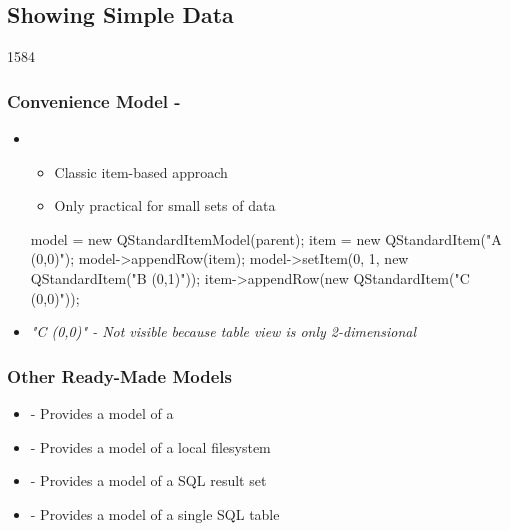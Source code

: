 %
%
%
%

\subsection{Showing Simple Data}


\begin{slide}[fragile]{1584}
\frametitle{Convenience Model - }
  \begin{itemize}
  \item {}
    \begin{itemize}
   \item Classic item-based approach
    \item Only practical for small sets of data
 \end{itemize}
   \begin{cpp}
model = new QStandardItemModel(parent);
item = new QStandardItem("A (0,0)");
model->appendRow(item);
model->setItem(0, 1, new QStandardItem("B (0,1)"));
item->appendRow(new QStandardItem("C (0,0)"));
\end{cpp}
\item \textit{"C (0,0)" - Not visible because table view is only 2-dimensional}
\end{itemize}
\end{slide}

\begin{slide}
\frametitle{Other Ready-Made Models}
\begin{itemize}
\item {} - Provides a model of a 
\item {} - Provides a model of a local filesystem
\item {} - Provides a model of a SQL result set
\item {} - Provides a model of a single SQL table
\end{itemize}
\end{slide}



